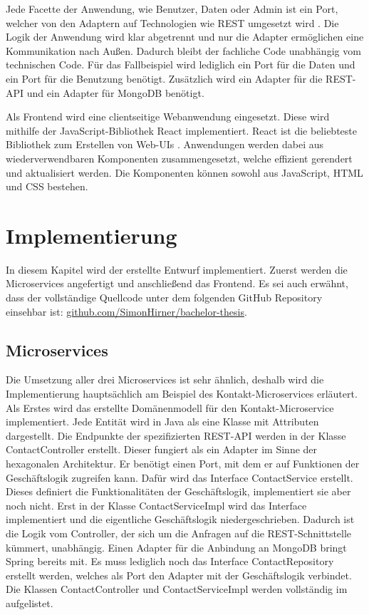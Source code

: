 Jede Facette der Anwendung, wie Benutzer, Daten oder Admin ist ein Port, welcher von den Adaptern auf Technologien wie \ac{REST} umgesetzt wird \parencite[vgl.][S. 204]{wolffMicroservices2018}. Die Logik der Anwendung wird klar abgetrennt und nur die Adapter ermöglichen eine Kommunikation nach Außen. Dadurch bleibt der fachliche Code unabhängig vom technischen Code. Für das Fallbeispiel wird lediglich ein Port für die Daten und ein Port für die Benutzung benötigt. Zusätzlich wird ein Adapter für die \ac{REST}-\ac{API} und ein Adapter für MongoDB benötigt.

Als Frontend wird eine clientseitige Webanwendung eingesetzt. Diese wird mithilfe der JavaScript-Bibliothek React implementiert. React ist die beliebteste Bibliothek zum Erstellen von Web-\acp{UI} \parencite[vgl.][]{stackoverflowMost2021}. Anwendungen werden dabei aus wiederverwendbaren Komponenten zusammengesetzt, welche effizient gerendert und aktualisiert werden. Die Komponenten können sowohl aus JavaScript, \ac{HTML} und \ac{CSS} bestehen. 

\clearpage
\section{Implementierung}
In diesem Kapitel wird der erstellte Entwurf implementiert. Zuerst werden die Microservices angefertigt und anschließend das Frontend. Es sei auch erwähnt, dass der vollständige Quellcode unter dem folgenden GitHub Repository einsehbar ist: \href{https://github.com/SimonHirner/bachelor-thesis}{github.com/SimonHirner/bachelor-thesis}.

\subsection{Microservices}
Die Umsetzung aller drei Microservices ist sehr ähnlich, deshalb wird die Implementierung hauptsächlich am Beispiel des Kontakt-Microservices erläutert. Als Erstes wird das erstellte Domänenmodell für den Kontakt-Microservice implementiert. Jede Entität wird in Java als eine Klasse mit Attributen dargestellt. Die Endpunkte der spezifizierten \ac{REST}-\ac{API} werden in der Klasse ContactController erstellt. Dieser fungiert als ein Adapter im Sinne der hexagonalen Architektur. Er benötigt einen Port, mit dem er auf Funktionen der Geschäftslogik zugreifen kann. Dafür wird das Interface ContactService erstellt. Dieses definiert die Funktionalitäten der Geschäftslogik, implementiert sie aber noch nicht. Erst in der Klasse ContactServiceImpl wird das Interface implementiert und die eigentliche Geschäftslogik niedergeschrieben. Dadurch ist die Logik vom Controller, der sich um die Anfragen auf die REST-Schnittstelle kümmert, unabhängig. Einen Adapter für die Anbindung an MongoDB bringt Spring bereits mit. Es muss lediglich noch das Interface ContactRepository erstellt werden, welches als Port den Adapter mit der Geschäftslogik verbindet. Die Klassen ContactController und ContactServiceImpl werden vollständig im  aufgelistet.

